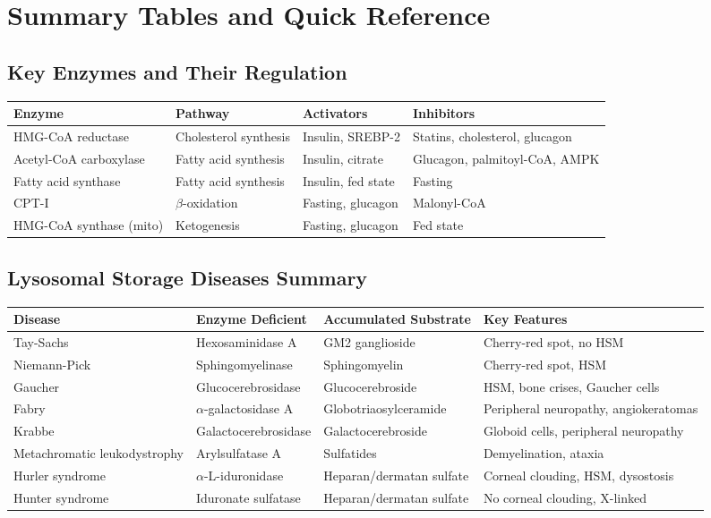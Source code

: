 \section{Summary Tables and Quick Reference}

\subsection{Key Enzymes and Their Regulation}

\begin{center}
\begin{tabular}{p{4cm}p{3.5cm}p{3.5cm}p{3.5cm}}
\toprule
\textbf{Enzyme} & \textbf{Pathway} & \textbf{Activators} & \textbf{Inhibitors} \\
\midrule
HMG-CoA reductase & Cholesterol synthesis & Insulin, SREBP-2 & Statins, cholesterol, glucagon \\
Acetyl-CoA carboxylase & Fatty acid synthesis & Insulin, citrate & Glucagon, palmitoyl-CoA, AMPK \\
Fatty acid synthase & Fatty acid synthesis & Insulin, fed state & Fasting \\
CPT-I & $\beta$-oxidation & Fasting, glucagon & Malonyl-CoA \\
HMG-CoA synthase (mito) & Ketogenesis & Fasting, glucagon & Fed state \\
\bottomrule
\end{tabular}
\end{center}

\subsection{Lysosomal Storage Diseases Summary}

\begin{center}
\begin{tabular}{p{3cm}p{3cm}p{4cm}p{4cm}}
\toprule
\textbf{Disease} & \textbf{Enzyme Deficient} & \textbf{Accumulated Substrate} & \textbf{Key Features} \\
\midrule
Tay-Sachs & Hexosaminidase A & GM2 ganglioside & Cherry-red spot, no HSM \\
Niemann-Pick & Sphingomyelinase & Sphingomyelin & Cherry-red spot, HSM \\
Gaucher & Glucocerebrosidase & Glucocerebroside & HSM, bone crises, Gaucher cells \\
Fabry & $\alpha$-galactosidase A
& Globotriaosylceramide & Peripheral neuropathy, angiokeratomas \\
Krabbe & Galactocerebrosidase & Galactocerebroside & Globoid cells, peripheral neuropathy \\
Metachromatic leukodystrophy & Arylsulfatase A & Sulfatides & Demyelination, ataxia \\
Hurler syndrome & $\alpha$-L-iduronidase & Heparan/dermatan sulfate & Corneal clouding, HSM, dysostosis \\
Hunter syndrome & Iduronate sulfatase & Heparan/dermatan sulfate & No corneal clouding, X-linked \\
\bottomrule
\end{tabular}
\end{center}

